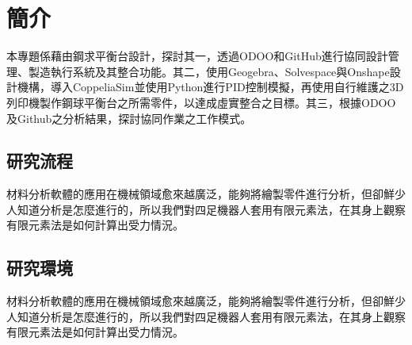 \chapter{簡介}
\renewcommand{\baselinestretch}{10.0} %

\fontsize{14pt}{2.5pt}\sectionef

本專題係藉由鋼求平衡台設計，探討其一，透過ODOO和GitHub進行協同設計管理、製造執行系統及其整合功能。其二，使用Geogebra、Solvespace與Onshape設計機構，導入CoppeliaSim並使用Python進行PID控制模擬，再使用自行維護之3D列印機製作鋼球平衡台之所需零件，以達成虛實整合之目標。其三，根據ODOO及Github之分析結果，探討協同作業之工作模式。

\section{研究流程}
材料分析軟體的應用在機械領域愈來越廣泛，能夠將繪製零件進行分析，但卻鮮少人知道分析是怎麼進行的，所以我們對四足機器人套用有限元素法，在其身上觀察有限元素法是如何計算出受力情況。\\


\section{研究環境}
材料分析軟體的應用在機械領域愈來越廣泛，能夠將繪製零件進行分析，但卻鮮少人知道分析是怎麼進行的，所以我們對四足機器人套用有限元素法，在其身上觀察有限元素法是如何計算出受力情況。\\
